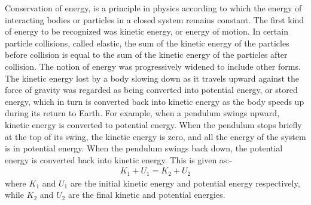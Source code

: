 \begin{phybox}{}
{Conservation of energy, is a principle in physics according to which the energy of interacting bodies or particles in a closed system remains constant. The first kind of energy to be recognized was kinetic energy, or energy of motion. In certain particle collisions, called elastic, the sum of the kinetic energy of the particles before collision is equal to the sum of the kinetic energy of the particles after collision. The notion of energy was progressively widened to include other forms. The kinetic energy lost by a body slowing down as it travels upward against the force of gravity was regarded as being converted into potential energy, or stored energy, which in turn is converted back into kinetic energy as the body speeds up during its return to Earth. For example, when a pendulum swings upward, kinetic energy is converted to potential energy. When the pendulum stops briefly at the top of its swing, the kinetic energy is zero, and all the energy of the system is in potential energy. When the pendulum swings back down, the potential energy is converted back into kinetic energy. This is given as:-
\begin{align*}
    K_1+U_1=K_2+U_2
\end{align*}
where $K_1$ and $U_1$ are the initial kinetic energy and potential energy respectively, while $K_2$ and $U_2$ are the final kinetic and potential energies.}
\end{phybox}

